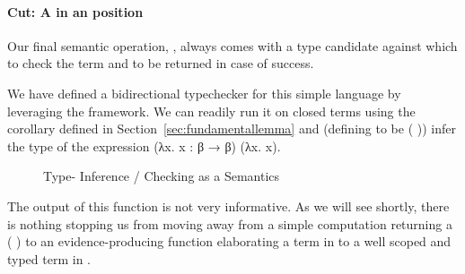 \paragraph{Cut: A  in an  position} 
Our final semantic operation, , 
always comes with a type candidate against which to check the term and
to be returned in case of success.
\begin{agdasnippet}
\end{agdasnippet}
%
We have defined a bidirectional typechecker for this simple language by
leveraging the \semrec{} framework. We can readily run it on closed terms
using the  corollary defined in Section~\ref{sec:fundamentallemma}
and (defining  to be {(  )}) infer the type of
the expression {(λx. x : β → β) (λx. x)}.

\begin{figure}[h!]
\begin{minipage}{0.35\textwidth}
\end{minipage}\hfill
\begin{minipage}{0.55\textwidth}
\end{minipage}
\caption{Type- Inference / Checking as a Semantics\label{defn:BidiSemantics}}
\end{figure}

The output of this function is not very informative. As we will see shortly,
there is nothing stopping us from moving away from a simple computation
returning a {( )} to an evidence-producing function
elaborating a term in  to a well scoped and typed term in .

